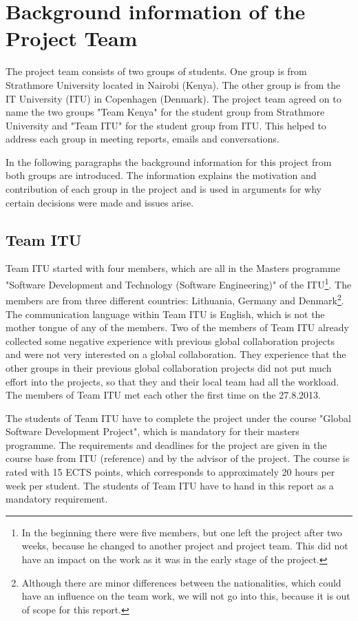 
\section{Background information of the Project Team}
The project team consists of two groups of students. One group is from Strathmore University located in Nairobi (Kenya). The other group is from the IT University (ITU) in Copenhagen (Denmark). The project team agreed on to name the two groups "Team Kenya" for the student group from Strathmore University and "Team ITU" for the student group from ITU. This helped to address each group in meeting reports, emails and conversations.

In the following paragraphs the background information for this project from both groups are introduced. The information explains the motivation and contribution of each group in the project and is used in arguments for why certain decisions were made and issues arise.


\subsection{Team ITU}
Team ITU started with four members, which are all in the Masters programme "Software Development and Technology (Software Engineering)" of the ITU\footnote{In the beginning there were five members, but one left the project after two weeks, because he changed to another project and project team. This did not have an impact on the work as it was in the early stage of the project.}. The members are from three different countries: Lithuania, Germany and Denmark\footnote{Although there are minor differences between the nationalities, which could have an influence on the team work, we will not go into this, because it is out of scope for this report.}. The communication language within Team ITU is English, which is not the mother tongue of any of the members. Two of the members of Team ITU already collected some negative experience with previous global collaboration projects and were not very interested on a global collaboration. They experience that the other groups in their previous global collaboration projects did not put much effort into the projects, so that they and their local team had all the workload. The members of Team ITU met each other the first time on the 27.8.2013.

The students of Team ITU have to complete the project under the course "Global Software Development Project", which is mandatory for their masters programme. The requirements and deadlines for the project are given in the course base from ITU (reference) and by the advisor of the project. The course is rated with 15 ECTS points, which corresponds to approximately 20 hours per week per student. The students of Team ITU have to hand in this report as a mandatory requirement.

